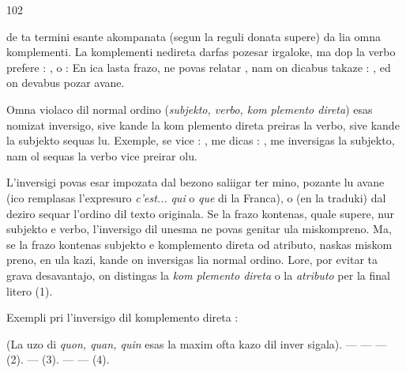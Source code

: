 \begin{VUpage}[106]{102}

\VUcontinue
de ta termini esante akompanata (segun la reguli donata\nl
supere) da lia omna komplementi. La komplementi nedireta\nl
darfas pozesar irgaloke, ma dop la verbo prefere : \nl
{}, o : \nl
{} En ica lasta frazo,  ne povas\nl
relatar , nam on dicabus takaze : \cc
{}, ed on devabus pozar  avane.

Omna violaco dil normal ordino (\textit{subjekto, verbo, kom}\cc
\textit{plemento direta}) esas nomizat inversigo, sive kande la kom\cc
plemento direta preiras la verbo, sive kande la subjekto\nl
sequas lu. Exemple, se vice : , me dicas :\nl
{}, me inversigas la subjekto, nam ol\nl
sequas la verbo vice preirar olu.

L'inversigi povas esar impozata dal bezono saliigar ter\cc
mino, pozante lu avane (ico remplasas l'expresuro \textit{c'est...}\nl
\textit{qui} o \textit{que} di la Franca), o (en la traduki) dal deziro sequar\nl
l'ordino dil texto originala. Se la frazo kontenas, quale\nl
supere, nur subjekto e verbo, l'inversigo dil unesma ne\nl
povas genitar ula miskompreno. Ma, se la frazo kontenas\nl
subjekto e komplemento direta od atributo, naskas miskom\cc
preno, en ula kazi, kande on inversigas lia normal ordino.\nl
Lore, por evitar ta grava desavantajo, on distingas la \textit{kom}\cc
\textit{plemento direta} o la \textit{atributo} per la final litero  (1).

Exempli pri l'inversigo dil komplemento direta :

 (La uzo\nl
di \textit{quon, quan, quin} esas la maxim ofta kazo dil  inver\cc
sigala). ---  ---\nl
{} --- \nl
{} (2). ---  (3).\nl
---  --- \nl
{} (4).
\end{VUpage}

